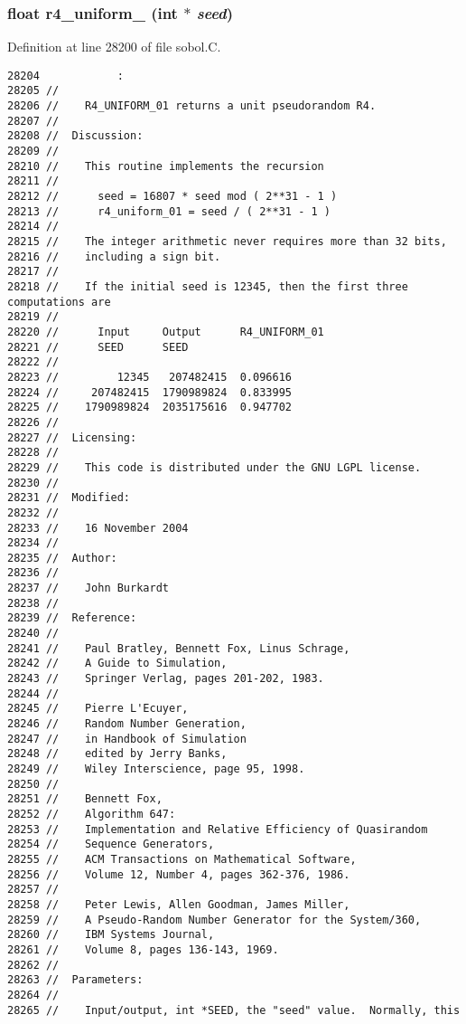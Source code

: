 \subsubsection{\setlength{\rightskip}{0pt plus 5cm}float r4\_\-uniform\_ (int $\ast$ {\em seed})}\label{sobol_8C_c7a3edc3054464fd79ad79a022b701e8}




Definition at line 28200 of file sobol.C.

\begin{Code}\begin{verbatim}28204            :
28205 //
28206 //    R4_UNIFORM_01 returns a unit pseudorandom R4.
28207 //
28208 //  Discussion:
28209 //
28210 //    This routine implements the recursion
28211 //
28212 //      seed = 16807 * seed mod ( 2**31 - 1 )
28213 //      r4_uniform_01 = seed / ( 2**31 - 1 )
28214 //
28215 //    The integer arithmetic never requires more than 32 bits,
28216 //    including a sign bit.
28217 //
28218 //    If the initial seed is 12345, then the first three computations are
28219 //
28220 //      Input     Output      R4_UNIFORM_01
28221 //      SEED      SEED
28222 //
28223 //         12345   207482415  0.096616
28224 //     207482415  1790989824  0.833995
28225 //    1790989824  2035175616  0.947702
28226 //
28227 //  Licensing:
28228 //
28229 //    This code is distributed under the GNU LGPL license. 
28230 //
28231 //  Modified:
28232 //
28233 //    16 November 2004
28234 //
28235 //  Author:
28236 //
28237 //    John Burkardt
28238 //
28239 //  Reference:
28240 //
28241 //    Paul Bratley, Bennett Fox, Linus Schrage,
28242 //    A Guide to Simulation,
28243 //    Springer Verlag, pages 201-202, 1983.
28244 //
28245 //    Pierre L'Ecuyer,
28246 //    Random Number Generation,
28247 //    in Handbook of Simulation
28248 //    edited by Jerry Banks,
28249 //    Wiley Interscience, page 95, 1998.
28250 //
28251 //    Bennett Fox,
28252 //    Algorithm 647:
28253 //    Implementation and Relative Efficiency of Quasirandom
28254 //    Sequence Generators,
28255 //    ACM Transactions on Mathematical Software,
28256 //    Volume 12, Number 4, pages 362-376, 1986.
28257 //
28258 //    Peter Lewis, Allen Goodman, James Miller,
28259 //    A Pseudo-Random Number Generator for the System/360,
28260 //    IBM Systems Journal,
28261 //    Volume 8, pages 136-143, 1969.
28262 //
28263 //  Parameters:
28264 //
28265 //    Input/output, int *SEED, the "seed" value.  Normally, this

\end{verbatim}
\end{Code}
